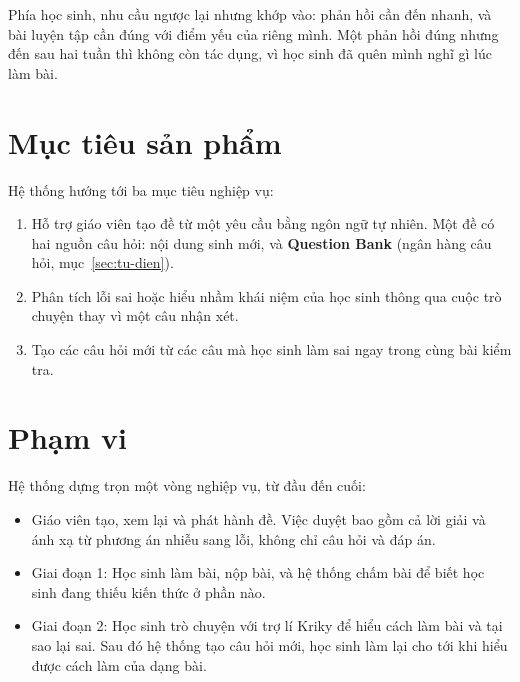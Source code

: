 Phía học sinh, nhu cầu ngược lại nhưng khớp vào: phản hồi cần đến nhanh, và bài luyện tập cần đúng
với điểm yếu của riêng mình. Một phản hồi đúng nhưng đến sau hai tuần thì không còn tác dụng, vì học
sinh đã quên mình nghĩ gì lúc làm bài.

\section{Mục tiêu sản phẩm}

Hệ thống hướng tới ba mục tiêu nghiệp vụ:

\begin{enumerate}
  \item Hỗ trợ giáo viên tạo đề từ một yêu cầu bằng ngôn ngữ tự nhiên. Một đề có hai nguồn câu
        hỏi: nội dung sinh mới, và \textbf{Question Bank} (ngân hàng câu hỏi,
        mục~\ref{sec:tu-dien}).
  \item Phân tích lỗi sai hoặc hiểu nhầm khái niệm của học sinh thông qua cuộc trò chuyện thay vì một câu nhận xét.
  \item Tạo các câu hỏi mới từ các câu mà học sinh làm sai ngay trong cùng bài kiểm tra.
\end{enumerate}

\section{Phạm vi}

Hệ thống dựng trọn một vòng nghiệp vụ, từ đầu đến cuối:

\begin{itemize}
  \item Giáo viên tạo, xem lại và phát hành đề. Việc duyệt bao gồm cả lời giải và ánh xạ từ
        phương án nhiễu sang lỗi, không chỉ câu hỏi và đáp án.
  \item Giai đoạn 1: Học sinh làm bài, nộp bài, và hệ thống chấm bài để biết học sinh đang thiếu kiến thức ở phần nào.
  \item Giai đoạn 2: Học sinh trò chuyện với trợ lí Kriky để hiểu cách làm bài và tại sao lại sai. 
        Sau đó hệ thống tạo câu hỏi mới, học sinh làm lại cho tới khi hiểu được cách làm của dạng bài.
\end{itemize}
